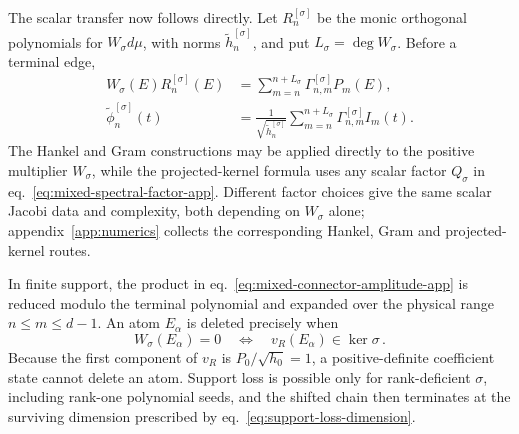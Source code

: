 \documentclass[a4paper,11pt]{article}
\def\dd{d}%
\theoremstyle{definition}
\theoremstyle{remark}
\newcommand{\dd}{\mathrm d}
\newcommand{\tphi}{\widetilde\phi}
\newcommand{\thh}{\widetilde h}
\begin{document}
The scalar transfer now follows directly.  Let $R_n^{[\sigma]}$ be the
monic orthogonal polynomials for $W_\sigma\dd\mu$, with norms
$\thh_n^{[\sigma]}$, and put $L_\sigma=\deg W_\sigma$.  Before a terminal
edge,
\begin{equation}
\begin{aligned}
   W_\sigma(E)R_n^{[\sigma]}(E)
   &=\sum_{m=n}^{n+L_\sigma}
      \Gamma_{n,m}^{[\sigma]}P_m(E),\\
   \tphi_n^{[\sigma]}(t)
   &=\frac{1}{\sqrt{\thh_n^{[\sigma]}}}
      \sum_{m=n}^{n+L_\sigma}
      \Gamma_{n,m}^{[\sigma]}I_m(t).
\end{aligned}
   \label{eq:mixed-connector-amplitude-app}
\end{equation}
The Hankel and Gram constructions may be applied directly to the positive multiplier $W_\sigma$, while the projected-kernel formula uses any scalar factor $Q_\sigma$ in eq.~\eqref{eq:mixed-spectral-factor-app}.  Different factor choices give the same scalar Jacobi data and complexity, both depending on $W_\sigma$ alone; appendix~\ref{app:numerics} collects the corresponding Hankel, Gram and projected-kernel routes.

In finite support, the product in
eq.~\eqref{eq:mixed-connector-amplitude-app} is reduced modulo the
terminal polynomial and expanded over the physical range
$n\le m\le d-1$.  An atom $E_\alpha$ is deleted precisely when
\begin{equation}
   W_\sigma(E_\alpha)=0
   \quad\Longleftrightarrow\quad
   v_R(E_\alpha)\in\ker\sigma\,.
\end{equation}
Because the first component of $v_R$ is
$P_0/\sqrt{h_0}=1$, a positive-definite coefficient state cannot delete
an atom.  Support loss is possible only for rank-deficient $\sigma$,
including rank-one polynomial seeds, and the shifted chain then
terminates at the surviving dimension prescribed by
eq.~\eqref{eq:support-loss-dimension}.
\end{document}
